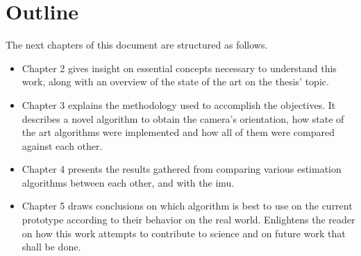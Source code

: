  		
\section{Outline}
\label{cha1:outline}

The next chapters of this document are structured as follows.
\begin{itemize}
\item	Chapter 2 gives insight on essential concepts necessary to understand this work, along with an overview of the state of the art on the thesis' topic.
	
\item	Chapter 3 explains the methodology used to accomplish the objectives. It describes a novel algorithm to obtain the camera's orientation, how state of the art algorithms were implemented and how all of them were compared against each other. 
	
\item	Chapter 4 presents the results gathered from comparing various estimation algorithms between each other, and with the \acrshort{imu}.
	
\item	Chapter 5 draws conclusions on which algorithm is best to use on the current prototype according to their behavior on the real world. Enlightens the reader on how this work attempts to contribute to science and on future work that shall be done.
	
\end{itemize}



